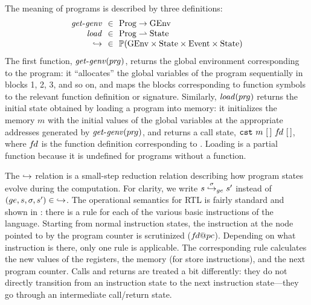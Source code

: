 \paragraph*{}

The meaning of programs is described by three definitions:
\[
\begin{array}{r@{~~}c@{~~}l}
\rtlgenv &\in& \rtlProg \to \rtlGEnv \\
\rtlload &\in& \rtlProg \pfun \rtlState\\
\estep{} &\in& \powset{\rtlGEnv\times\rtlState\times\rtlEvent\times\rtlState}\\
\end{array}
\]
The first function, $\mathit{get\text{-}genv}({pr\hspace*{-1pt}g})$, returns the global environment corresponding to the program:
it ``allocates'' the global variables of the program sequentially in blocks 1, 2, 3, and so on, and
maps the blocks corresponding to function symbols to the relevant function definition or signature.
Similarly, $\mathit{load}({pr\hspace*{-1pt}g})$ returns the initial state obtained by loading a program into memory: it
initializes the memory $m$ with the initial values of the global variables at the appropriate
addresses generated by $\mathit{get\text{-}genv}({pr\hspace*{-1pt}g})$, and returns a call state, $\mathtt{cst}~m~[\,]~{f\hspace*{-1pt}d}~[\,]$,
where ${f\hspace*{-1pt}d}$ is the function definition corresponding to .  Loading is a partial
function because it is undefined for programs without a  function.



The $\stackrel{}{\hookrightarrow}$ relation is a small-step reduction relation describing how program states evolve
during the computation.  For clarity, we write $s \stackrel{\sigma}{\hookrightarrow}_{ge} s'$ instead of
$(ge,s,\sigma,s')\in {\stackrel{}{\hookrightarrow}}$.  The operational semantics for RTL is fairly standard and shown in
: there is a rule for each of the various basic instructions of the
language.  Starting from normal instruction states, the instruction at the node pointed to by the
program counter is scrutinized ($\vfd@pc$).  Depending on what instruction is there, only one rule
is applicable.  The corresponding rule calculates the new values of the registers, the memory (for
store instructions), and the next program counter.  Calls and returns are treated a bit differently:
they do not directly transition from an instruction state to the next instruction state---they go
through an intermediate call/return state.

